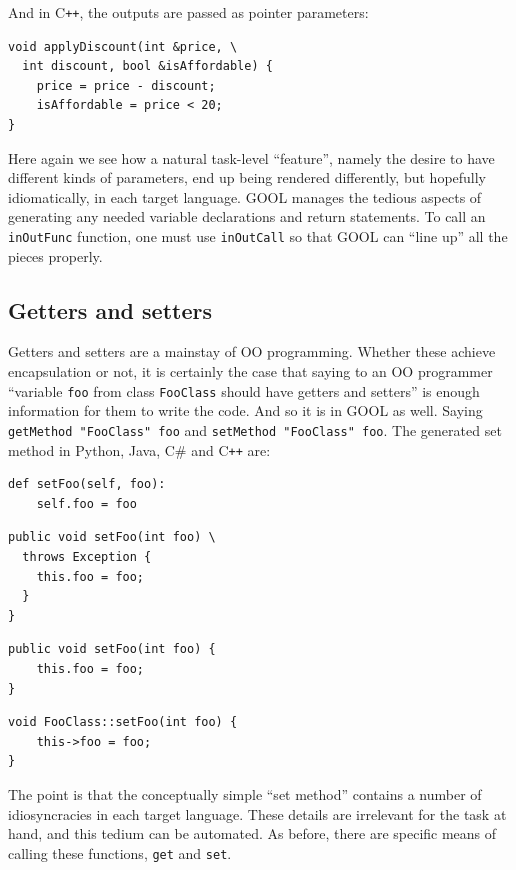 \documentclass[sigplan,review,anonymous,prologue,dvipsnames]{acmart}
\newcommand{\Csharp}{C\#}
\newcommand{\Cplusplus}{C\texttt{++}}
\begin{document}
And in \Cplusplus, the outputs are passed as pointer parameters:
\begin{lstlisting}
void applyDiscount(int &price, \
  int discount, bool &isAffordable) {
    price = price - discount;
    isAffordable = price < 20;
}
\end{lstlisting}
Here again we see how a natural task-level ``feature'', namely the
desire to have different kinds of parameters, end up being rendered differently,
but hopefully idiomatically, in each target language.  GOOL manages the
tedious aspects of generating any needed variable declarations and return
statements.  To call an \verb|inOutFunc| function, one must use
\verb|inOutCall| so that GOOL can ``line up'' all the pieces properly.

\subsection{Getters and setters}

Getters and setters are a mainstay of OO programming.  Whether these achieve
encapsulation or not, it is certainly the case that saying to an OO programmer
``variable \verb|foo| from class \verb|FooClass| should have getters and setters''
is enough information for them to write the code. And so it is in GOOL as well.
Saying \verb|getMethod "FooClass" foo| and \verb|setMethod "FooClass" foo|. 
The generated set method in Python, Java, \Csharp{} and \Cplusplus{} are:
\begin{lstlisting}
def setFoo(self, foo):
    self.foo = foo
\end{lstlisting}

\begin{lstlisting}
public void setFoo(int foo) \
  throws Exception {
    this.foo = foo;
  }
}
\end{lstlisting}

\begin{lstlisting}
public void setFoo(int foo) {
    this.foo = foo;
}
\end{lstlisting}

\begin{lstlisting}
void FooClass::setFoo(int foo) {
    this->foo = foo;
}
\end{lstlisting}
The point is that the conceptually simple ``set method'' contains a number
of idiosyncracies in each target language. These details are irrelevant for
the task at hand, and this tedium can be automated. As before, there are
specific means of calling these functions, \verb|get| and \verb|set|.
\end{document}
